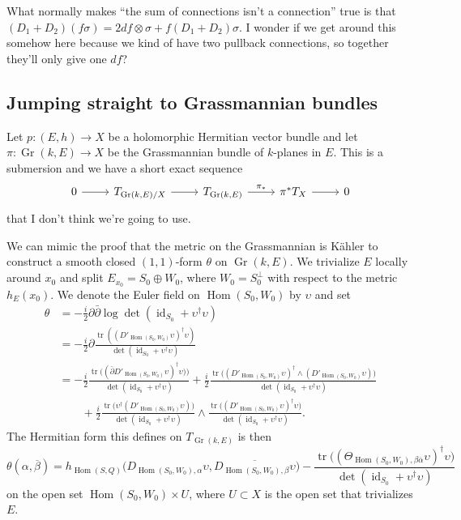 \documentclass[10pt,a4paper]{article}
\def\ov#1{\overline{#1}}
\DeclareMathOperator{\Gr}{Gr}
\DeclareMathOperator{\Hom}{Hom}
\DeclareMathOperator{\id}{id}
\DeclareMathOperator{\tr}{tr}
\begin{document}
What normally makes ``the sum of connections isn't a connection'' true is that $(D_1 + D_2)(f \sigma) = 2df \otimes \sigma + f(D_1 + D_2)\sigma$. I wonder if we get around this somehow here because we kind of have two pullback connections, so together they'll only give one $df$?



\subsection{Jumping straight to Grassmannian bundles}

Let $p: (E,h) \to X$ be a holomorphic Hermitian vector bundle and let $\pi: \Gr(k,E) \to X$ be the Grassmannian bundle of $k$-planes in $E$. This is a submersion and we have a short exact sequence
\[
\begin{tikzcd}
0 \ar[r] &
T_{\Gr(k,E)/X} \ar[r] &
T_{\Gr(k,E)} \ar[r,"\pi_*"] &
\pi^* T_X \ar[r]
& 0
\end{tikzcd}
\]
that I don't think we're going to use.

We can mimic the proof that the metric on the Grassmannian is K\"ahler to construct a smooth closed $(1,1)$-form $\theta$ on $\Gr(k,E)$. We trivialize $E$ locally around $x_0$ and split $E_{x_0} = S_0 \oplus W_0$, where $W_0 = S_0^\perp$ with respect to the metric $h_E(x_0)$. We denote the Euler field on $\Hom(S_0,W_0)$ by $\upsilon$ and set
\begin{align*}
\theta
&=- \frac i2 \partial\bar\partial \log \det(\id_{S_0} + \upsilon^\dagger \upsilon)
\\
&= -\frac i2 \partial \frac{\tr((D'_{\Hom(S_0,W_0)}\upsilon)^\dagger \upsilon)}{\det(\id_{S_0} + \upsilon^\dagger \upsilon)}
\\
&=
-\frac i2
\frac{
\tr\bigl((
\bar\partial D'_{\Hom(S_0,W_0)}\upsilon)^\dagger \upsilon)
\bigr)
}{\det(\id_{S_0} + \upsilon^\dagger \upsilon)}
+
\frac i2
\frac{\tr\bigl(
(D'_{\Hom(S_0,W_0)}\upsilon)^\dagger \wedge (D'_{\Hom(S_0,W_0)}\upsilon)
\bigr)
}{\det(\id_{S_0} + \upsilon^\dagger \upsilon)}
\\
&\qquad
+ \frac i2
\frac{\tr\bigl(
\upsilon^\dagger (D'_{\Hom(S_0,W_0)}\upsilon)
\bigr)
}{\det(\id_{S_0} + \upsilon^\dagger \upsilon)}
\wedge
\frac{\tr\bigl(
(D'_{\Hom(S_0,W_0)}\upsilon)^\dagger \upsilon
\bigr)
}{\det(\id_{S_0} + \upsilon^\dagger \upsilon)}.
\end{align*}
The Hermitian form this defines on $T_{\Gr(k,E)}$ is then
\[
\theta(\alpha, \ov\beta)
= h_{\Hom(S,Q)}\bigl(
D_{\Hom(S_0,W_0), \alpha} \upsilon,
\ov{D_{\Hom(S_0,W_0), \beta} \upsilon}
\bigr)
- \frac{\tr\bigl(
(\Theta_{\Hom(S_0,W_0),\beta\ov\alpha}\upsilon)^\dagger \upsilon
\bigr)}{\det(\id_{S_0} + \upsilon^\dagger \upsilon)}
\]
on the open set $\Hom(S_0,W_0) \times U$, where $U \subset X$ is the open set that trivializes $E$.
\end{document}

